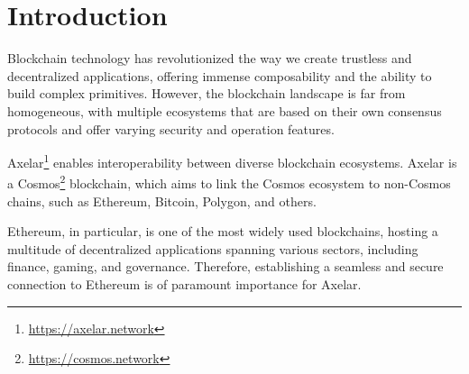 \section{Introduction}
% 

% 

Blockchain technology has revolutionized the way we create trustless and decentralized applications, offering immense composability and the ability to build complex primitives. However, the blockchain landscape is far from homogeneous, with multiple ecosystems that are based on their own consensus protocols and offer varying security and operation features. 

Axelar\footnote{\url{https://axelar.network}} enables interoperability between diverse blockchain ecosystems. Axelar is a Cosmos\footnote{\url{https://cosmos.network}} blockchain, which aims to link the Cosmos ecosystem to non-Cosmos chains, such as Ethereum, Bitcoin, Polygon, and others.

Ethereum, in particular, is one of the most widely used blockchains, hosting a multitude of decentralized applications spanning various sectors, including finance, gaming, and governance. Therefore, establishing a seamless and secure connection to Ethereum is of paramount importance for Axelar. %

